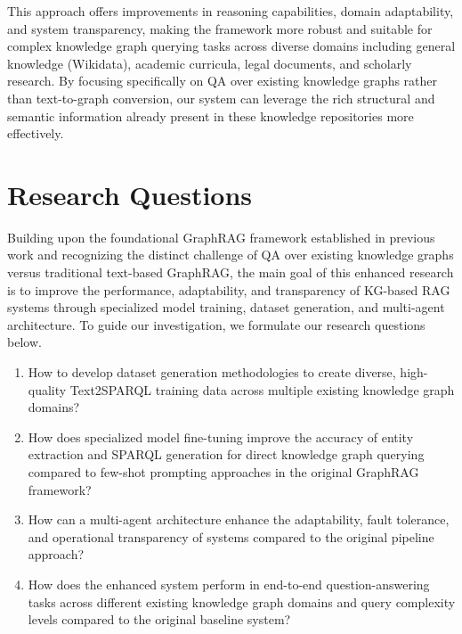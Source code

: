This approach offers improvements in reasoning capabilities, domain adaptability, and system transparency, making the framework more robust and suitable for complex knowledge graph querying tasks across diverse domains including general knowledge (Wikidata), academic curricula, legal documents, and scholarly research. By focusing specifically on QA over existing knowledge graphs rather than text-to-graph conversion, our system can leverage the rich structural and semantic information already present in these knowledge repositories more effectively.

\section{Research Questions}
\label{sec:masalah}
Building upon the foundational GraphRAG framework established in previous work and recognizing the distinct challenge of QA over existing knowledge graphs versus traditional text-based GraphRAG, the main goal of this enhanced research is to improve the performance, adaptability, and transparency of KG-based RAG systems through specialized model training, dataset generation, and multi-agent architecture. To guide our investigation, we formulate our research questions below.

\begin{enumerate}
    \item How to develop dataset generation methodologies to create diverse, high-quality Text2SPARQL training data across multiple existing knowledge graph domains?
    
    \item How does specialized model fine-tuning improve the accuracy of entity extraction and SPARQL generation for direct knowledge graph querying compared to few-shot prompting approaches in the original GraphRAG framework?
    
    \item How can a multi-agent architecture enhance the adaptability, fault tolerance, and operational transparency of systems compared to the original pipeline approach?

    \item How does the enhanced system perform in end-to-end question-answering tasks across different existing knowledge graph domains and query complexity levels compared to the original baseline system?
\end{enumerate}

